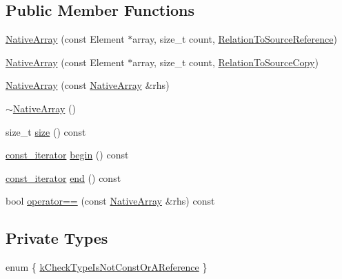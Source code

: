 \subsection*{Public Member Functions}
\begin{DoxyCompactItemize}
\item 
\hyperlink{classtesting_1_1internal_1_1NativeArray_a52b3689c62532703d11e9d82939a7141}{Native\+Array} (const Element $\ast$array, size\+\_\+t count, \hyperlink{structtesting_1_1internal_1_1RelationToSourceReference}{Relation\+To\+Source\+Reference})
\item 
\hyperlink{classtesting_1_1internal_1_1NativeArray_ac184ee5741af5be3402213819c834405}{Native\+Array} (const Element $\ast$array, size\+\_\+t count, \hyperlink{structtesting_1_1internal_1_1RelationToSourceCopy}{Relation\+To\+Source\+Copy})
\item 
\hyperlink{classtesting_1_1internal_1_1NativeArray_abb346ac3040f5da733f594cc2d5958bc}{Native\+Array} (const \hyperlink{classtesting_1_1internal_1_1NativeArray}{Native\+Array} \&rhs)
\item 
\hyperlink{classtesting_1_1internal_1_1NativeArray_a55ab5948d473a487303dcf6e02ad1f60}{$\sim$\+Native\+Array} ()
\item 
size\+\_\+t \hyperlink{classtesting_1_1internal_1_1NativeArray_af96a4a5ca0cdd5d163c47a081f08bd89}{size} () const
\item 
\hyperlink{classtesting_1_1internal_1_1NativeArray_a9ce7c8408460d7158a2870456d134557}{const\+\_\+iterator} \hyperlink{classtesting_1_1internal_1_1NativeArray_a3046d93cfa23097e7b7c91f5f982dc78}{begin} () const
\item 
\hyperlink{classtesting_1_1internal_1_1NativeArray_a9ce7c8408460d7158a2870456d134557}{const\+\_\+iterator} \hyperlink{classtesting_1_1internal_1_1NativeArray_ae1cda748e49c6906421c6183c4d07c5a}{end} () const
\item 
bool \hyperlink{classtesting_1_1internal_1_1NativeArray_a81b90f5739ed812610e68dc34c9e3850}{operator==} (const \hyperlink{classtesting_1_1internal_1_1NativeArray}{Native\+Array} \&rhs) const
\end{DoxyCompactItemize}
\subsection*{Private Types}
\begin{DoxyCompactItemize}
\item 
enum \{ \hyperlink{classtesting_1_1internal_1_1NativeArray_abe36a7e1b487dc6b9bd81489b1c2af28a3be52e24b6c1558a819baf99922f9296}{k\+Check\+Type\+Is\+Not\+Const\+Or\+A\+Reference}
 \}
\end{DoxyCompactItemize}
